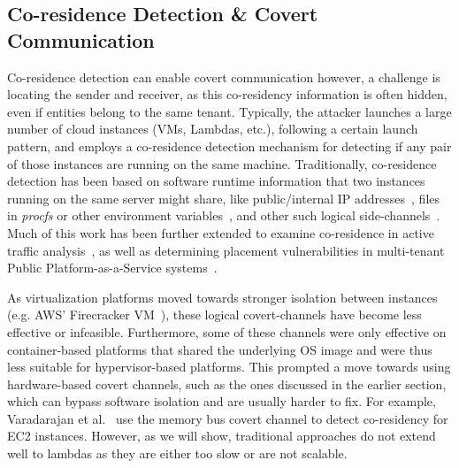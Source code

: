 \subsection{Co-residence Detection \& Covert Communication}
\label{sec:background:pastwork}


Co-residence detection can enable covert communication however, a challenge is
locating the sender and receiver, as this co-residency information is often
hidden, even if entities belong to the same tenant.  Typically, the attacker
launches a large number of cloud instances (VMs, Lambdas, etc.), following a
certain launch pattern, and employs a co-residence detection mechanism for
detecting if any pair of those instances are running on the same machine.
Traditionally, co-residence detection has been based on software runtime
information that two instances running on the same server might share, like
public/internal IP addresses~\cite{ristenpartccs2009}, files in \textit{procfs}
or other environment variables~\cite{wangusenix2018,wuusenix2012}, and other
such logical side-channels~\cite{varad191016,vmplacement}. Much of this work has
been further extended to examine co-residence in active traffic
analysis~\cite{bates2012}, as well as determining placement vulnerabilities in
multi-tenant Public Platform-as-a-Service systems~\cite{varadarajan2015,
zhangpaas2016}. 

As virtualization platforms moved towards stronger isolation between instances
(e.g.  AWS' Firecracker VM~\cite{firecracker}), these logical covert-channels
have become less effective or infeasible. Furthermore, some of these channels
were only effective on container-based platforms that shared the underlying OS
image and were thus less suitable for hypervisor-based platforms.  This prompted
a move towards using hardware-based covert channels, such as the ones discussed
in the earlier section, which can bypass software isolation and are usually
harder to fix. For example, Varadarajan et al.~\cite{varadarajan2015} use the
memory bus covert channel to detect co-residency for EC2 instances.  However, as
we will show, traditional approaches do not extend well to lambdas as they are
either too slow or are not scalable.



